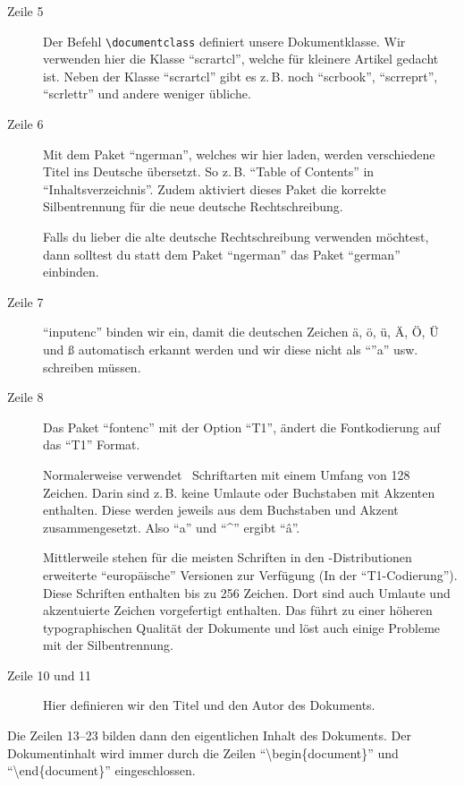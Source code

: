 \begin{description}
\item[Zeile 5] Der Befehl \texttt{\textbackslash documentclass} definiert unsere Dokumentklasse. Wir verwenden hier die Klasse \enquote{scrartcl}, welche für kleinere Artikel gedacht ist. Neben der \KOMAScript{} Klasse \enquote{scrartcl} gibt es z.\,B. noch \enquote{scrbook}, \enquote{scrreprt}, \enquote{scrlettr} und andere weniger übliche.
\item[Zeile 6] Mit dem Paket \enquote{ngerman}, welches wir hier laden, werden verschiedene Titel ins Deutsche übersetzt. So z.\,B. \enquote{Table of Contents} in \enquote{Inhaltsverzeichnis}. Zudem aktiviert dieses Paket die korrekte Silbentrennung für die neue deutsche Rechtschreibung.

Falls du lieber die alte deutsche Rechtschreibung verwenden möchtest, dann solltest du statt dem Paket \enquote{ngerman} das Paket \enquote{german} einbinden.
\item[Zeile 7] \enquote{inputenc} binden wir ein, damit die deutschen Zeichen ä, ö, ü, Ä, Ö, Ü und ß automatisch erkannt werden und wir diese nicht als \enquote{''a} usw. schreiben müssen.
\item[Zeile 8] Das Paket \enquote{fontenc} mit der Option \enquote{T1}, ändert die Fontkodierung auf das \enquote{T1} Format. %

Normalerweise verwendet \DMLLaTeX \ Schriftarten mit einem Umfang von 128 Zeichen. Darin sind z.\,B. keine Umlaute oder Buchstaben mit Akzenten enthalten. Diese werden jeweils aus dem Buchstaben und Akzent zusammengesetzt. Also \enquote{a} und \enquote{\textasciicircum} ergibt \enquote{â}.

Mittlerweile stehen für die meisten Schriften in den \DMLLaTeX-Distributionen erweiterte \enquote{europäische} Versionen zur Verfügung (In der \enquote{T1-Codierung}). Diese Schriften enthalten bis zu 256 Zeichen. Dort sind auch Umlaute und akzentuierte Zeichen vorgefertigt enthalten. Das führt zu einer höheren typographischen Qualität der Dokumente und löst auch einige Probleme mit der Silbentrennung.
\item[Zeile 10 und 11] Hier definieren wir den Titel und den Autor des Dokuments.
\end{description}

Die Zeilen 13--23 bilden dann den eigentlichen Inhalt des Dokuments. Der Dokumentinhalt wird immer durch die Zeilen \enquote{\textbackslash begin\{document\}} und \enquote{\textbackslash end\{document\}} eingeschlossen.

